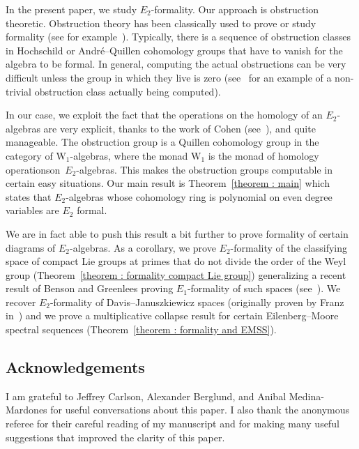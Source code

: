 \documentclass[AHL,Unicode,longabstracts,published]{cedram}
\newcommand{\W}{\mathrm{W}}
\begin{document}
In the present paper, we study $E_2$-formality. Our approach is obstruction theoretic. Obstruction theory has been classically used to prove or study formality (see for example~\cite{
berglundkoszul,emprinkaledin,
halperinstasheff,salehformality}). Typically, there is a sequence of obstruction classes in Hochschild or André--Quillen cohomology groups that have to vanish for the algebra to be formal. In general, computing the actual obstructions can be very difficult unless the group in which they live is zero (see~\cite[Proposition~6.9]{salvatoreformality} for an example of a non-trivial obstruction class actually being computed).


In our case, we exploit the fact that the operations on the homology of an $E_2$-algebras are very explicit, thanks to the work of Cohen (see~\cite{cohenladamay}), and quite manageable. The obstruction group is a Quillen cohomology group in the category of $\W_1$-algebras, where the monad $\W_1$ is the monad of homology operations\linebreak on~$E_2$-algebras. This makes the obstruction groups computable in certain easy situations. Our main result is Theorem~\ref{theorem : main} which states that $E_2$-algebras whose cohomology ring is polynomial on even degree variables are $E_2$ formal.

We are in fact able to push this result a bit further to prove formality of certain diagrams of $E_2$-algebras. As a corollary, we prove $E_2$-formality of the classifying space of compact Lie groups at primes that do not divide the order of the Weyl group (Theorem~\ref{theorem : formality compact Lie group}) generalizing a recent result of Benson and Greenlees proving $E_1$-formality of such spaces (see~\cite{bensonformality}). We recover $E_2$-formality of Davis--Januszkiewicz spaces (originally proven by Franz in~\cite{franzhomotopy}) and we prove a multiplicative collapse result for certain Eilenberg--Moore spectral sequences (Theorem~\ref{theorem : formality and EMSS}).

\subsection*{Acknowledgements}
I am grateful to Jeffrey Carlson, Alexander Berglund, and Anibal Medina-Mardones for useful conversations about this paper. I also thank the anonymous referee for their careful reading of my manuscript and for making many useful suggestions that improved the clarity of this paper.
\end{document}

